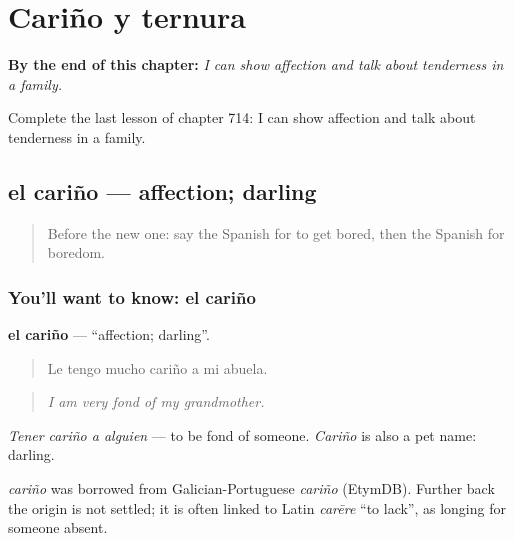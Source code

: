 
\chapter{Cariño y ternura}
\label{ch:es-carino-y-ternura}

\begin{chapteropening}
\textbf{By the end of this chapter:} \emph{I can show affection and talk about tenderness in a family.}

Complete the last lesson of chapter 714: I can show affection and talk about tenderness in a family.
\end{chapteropening}

\section[el cariño]{el cariño — affection; darling}

\label{lesson:ES-C714-carino}



\begin{quote}
Before the new one: say the Spanish for to get bored, then the Spanish for boredom.
\end{quote}

\subsection*{You'll want to know: el cariño}
\textbf{el cariño} — \textquotedblleft{}affection; darling\textquotedblright{}.

\begin{quote}
Le tengo mucho cariño a mi abuela.
\end{quote}

\begin{quote}
\emph{I am very fond of my grandmother.}
\end{quote}

\emph{Tener cariño a alguien} — to be fond of someone. \emph{Cariño} is also a pet name: darling.

\begin{cousinweb}
\emph{cariño} was borrowed from Galician-Portuguese \emph{cariño} (EtymDB). Further back the origin is not settled; it is often linked to Latin \emph{carēre} \textquotedblleft{}to lack\textquotedblright{}, as longing for someone absent.
\end{cousinweb}

